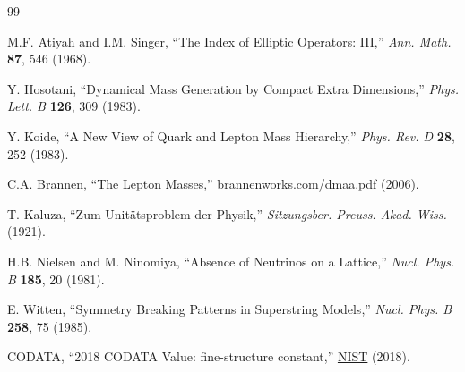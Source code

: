 \documentclass[12pt,a4paper]{article}
\theoremstyle{definition}
\theoremstyle{remark}
\begin{document}
\begin{thebibliography}{99}

M.F. Atiyah and I.M. Singer, ``The Index of Elliptic Operators: III,'' \textit{Ann. Math.} \textbf{87}, 546 (1968).

Y. Hosotani, ``Dynamical Mass Generation by Compact Extra Dimensions,'' \textit{Phys. Lett. B} \textbf{126}, 309 (1983).

Y. Koide, ``A New View of Quark and Lepton Mass Hierarchy,'' \textit{Phys. Rev. D} \textbf{28}, 252 (1983).

C.A. Brannen, ``The Lepton Masses,'' \href{https://brannenworks.com/dmaa.pdf}{brannenworks.com/dmaa.pdf} (2006).

T. Kaluza, ``Zum Unit\"atsproblem der Physik,'' \textit{Sitzungsber. Preuss. Akad. Wiss.} (1921).

H.B. Nielsen and M. Ninomiya, ``Absence of Neutrinos on a Lattice,'' \textit{Nucl. Phys. B} \textbf{185}, 20 (1981).

E. Witten, ``Symmetry Breaking Patterns in Superstring Models,'' \textit{Nucl. Phys. B} \textbf{258}, 75 (1985).

CODATA, ``2018 CODATA Value: fine-structure constant,'' \href{https://physics.nist.gov/cgi-bin/cuu/Value?alph}{NIST} (2018).

\end{thebibliography}
\end{document}
